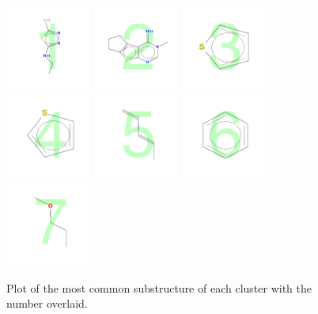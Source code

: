 \documentclass[12pt, a4paper]{scrartcl}\usepackage[]{graphicx}\usepackage[]{color}
\begin{document}
\begin{figure}[h!]
\centering
\includegraphics[width=0.25\textwidth]{./figure/plotClusterReps1.pdf}%
\includegraphics[width=0.25\textwidth]{./figure/plotClusterReps2.pdf}%
\includegraphics[width=0.25\textwidth]{./figure/plotClusterReps3.pdf}
\includegraphics[width=0.25\textwidth]{./figure/plotClusterReps4.pdf}%
\includegraphics[width=0.25\textwidth]{./figure/plotClusterReps5.pdf}%
\includegraphics[width=0.25\textwidth]{./figure/plotClusterReps6.pdf}
\includegraphics[width=0.25\textwidth]{./figure/plotClusterReps7.pdf}%
\caption{Plot of the most common substructure of each cluster with the number overlaid.}
\label{fig:clusterep}
\end{figure}
\end{document}
